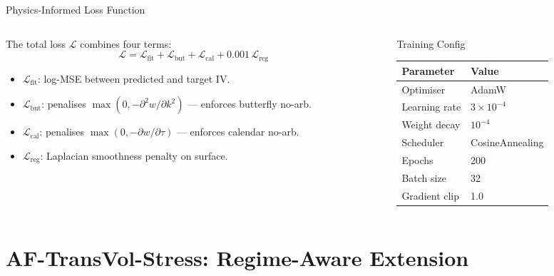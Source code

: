 \documentclass[aspectratio=169,10pt]{beamer}
\begin{document}
\begin{frame}{Physics-Informed Loss Function}
  \begin{columns}[T]
    \begin{column}{0.56\textwidth}
      \small The total loss $\mathcal{L}$ combines four terms:
      \[
        \mathcal{L}=\mathcal{L}_\text{fit}+\mathcal{L}_\text{but}+\mathcal{L}_\text{cal}+0.001\,\mathcal{L}_\text{reg}
      \]
      \begin{itemize}\itemsep4pt
        \item $\mathcal{L}_\text{fit}$: log-MSE between predicted and target IV.
        \item $\mathcal{L}_\text{but}$: penalises $\max(0,-\partial^2w/\partial k^2)$ --- enforces butterfly no-arb.
        \item $\mathcal{L}_\text{cal}$: penalises $\max(0,-\partial w/\partial\tau)$ --- enforces calendar no-arb.
        \item $\mathcal{L}_\text{reg}$: Laplacian smoothness penalty on surface.
      \end{itemize}
    \end{column}
    \begin{column}{0.41\textwidth}
      \begin{block}{Training Config}
        \footnotesize
        \begin{tabular}{ll}
          \toprule
          Parameter & Value \\
          \midrule
          Optimiser      & AdamW \\
          Learning rate  & $3\times10^{-4}$ \\
          Weight decay   & $10^{-4}$ \\
          Scheduler      & CosineAnnealing \\
          Epochs         & 200 \\
          Batch size     & 32 \\
          Gradient clip  & 1.0 \\
          \bottomrule
        \end{tabular}
      \end{block}
    \end{column}
  \end{columns}
\end{frame}

\section{AF-TransVol-Stress: Regime-Aware Extension}
\end{document}
